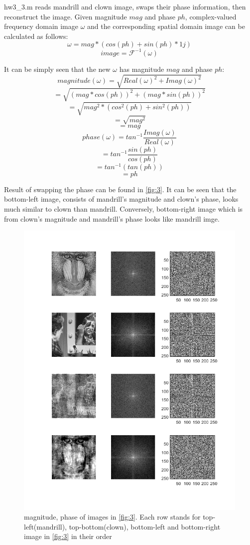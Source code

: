 \documentclass[extendedabs]{bmvc2k}
\begin{document}
hw3\_3.m reads mandrill and clown image, swaps their phase information, then reconstruct the image.
Given magnitude $mag$ and phase $ph$, complex-valued frequency domain image $\omega$ and the corresponding 
spatial domain image can be calculated as follows:
\[\omega = mag * (cos(ph) + sin(ph) * 1j)\]
\[image = \mathcal{F}^{-1}(\omega)\]

It can be simply seen that the new $\omega$ has magnitude $mag$ and phase $ph$:
\[magnitude(\omega) = \sqrt{Real(\omega)^2 + Imag(\omega)^2}\]
\[= \sqrt{(mag * cos(ph))^2 + (mag * sin(ph))^2}\]
\[= \sqrt{mag^2 * (cos^2(ph) + sin^2(ph))}\]
\[= \sqrt{mag^2}\]
\[ = mag\] 
\[phase(\omega) = tan^{-1}\frac{Imag(\omega)}{Real(\omega)}\]
\[= tan^{-1}\frac{sin(ph)}{cos(ph)}\]
\[= tan^{-1}(tan(ph))\]
\[ = ph\]

Result of swapping the phase can be found in \figurename{\ref{fig:3}}.
It can be seen that the bottom-left image, consists of mandrill's magnitude and clown's phase,
looks much similar to clown than mandrill. Conversely, bottom-right image which is from clown's
magnitude and mandrill's phase looks like mandrill imge.

\begin{figure}[h]
    \centering
    \includegraphics[width=\linewidth]{hw3_3_2}
    \caption{magnitude, phase of images in \figurename{\ref{fig:3}}. Each row stands for
    top-left(mandrill), top-bottom(clown), bottom-left and bottom-right image in \figurename{\ref{fig:3}} 
    in their order}
    \label{fig:4}
\end{figure}
\end{document}
